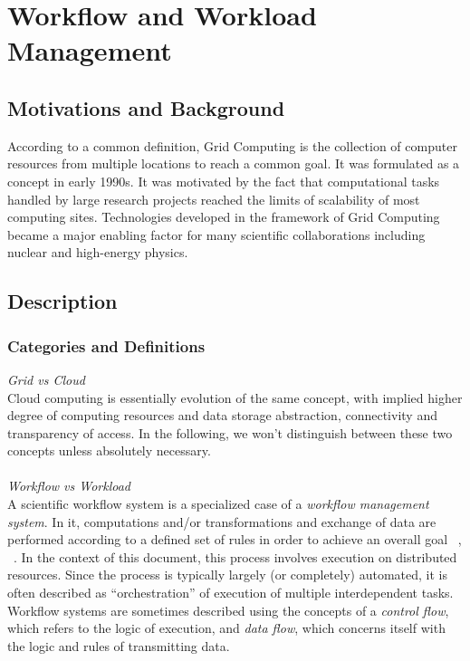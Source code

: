 \section{Workflow and Workload Management}

\subsection{Motivations and Background}
According to a common definition, Grid Computing is the collection of computer resources from multiple locations to reach a common goal. 
It was formulated as a concept in early 1990s. It was motivated by the fact that computational tasks handled by large research projects reached the limits of scalability of most computing sites. Technologies developed in the framework of Grid Computing became a major enabling factor for many scientific collaborations including nuclear and high-energy physics.

\subsection{Description}
\subsubsection{Categories and Definitions}

\textit{Grid vs Cloud}
\\
Cloud computing is essentially evolution of the same concept, with implied higher degree of computing resources and data storage abstraction, connectivity and transparency of access. In the following, we won't distinguish between these two concepts unless absolutely necessary.
\\
\\
\textit{Workflow vs Workload}
\\
A scientific workflow system is a specialized case of a \textit{workflow management system}. In it, computations and/or transformations and exchange of data are performed according to a defined set of rules in order to achieve an overall goal ~\cite{grid_workflow_taxonomy}, ~\cite{grid_workflow_fit}. In the context of this document, this process involves execution on distributed resources. Since the process is typically largely (or completely) automated, it is often described as ``orchestration'' of execution of multiple interdependent tasks. Workflow systems are sometimes described using the concepts of a \textit{control flow}, which refers to the logic of execution, and \textit{data flow}, which concerns itself with the logic and rules of transmitting data.

